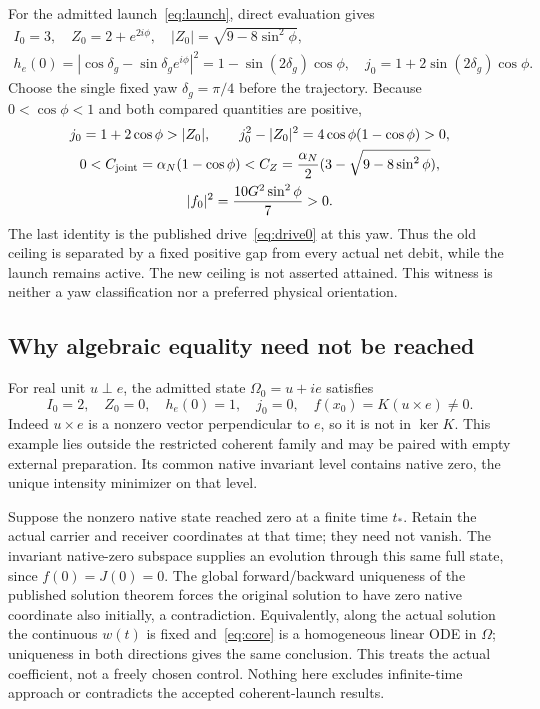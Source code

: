 For the admitted launch~\eqref{eq:launch}, direct evaluation gives
\begin{equation}\label{eq:launchprojection}%
\begin{gathered}
I_0=3,\quad Z_0=2+e^{2i\phi},\quad |Z_0|=\sqrt{9-8\sin^2\phi},\\
h_e(0)=|\cos\delta_g-\sin\delta_g e^{i\phi}|^2
=1-\sin(2\delta_g)\cos\phi,\quad
j_0=1+2\sin(2\delta_g)\cos\phi .
\end{gathered}
\end{equation}
Choose the single fixed yaw $\delta_g=\pi/4$ before the trajectory. Because $0<\cos\phi<1$ and both compared quantities are positive,
\begin{equation}\label{eq:strictwitness}%
\begin{gathered}
j_0=1+2\cos\phi>|Z_0|,\qquad
j_0^2-|Z_0|^2=4\cos\phi(1-\cos\phi)>0,\\
0<C_{\rm joint}=\alpha_N(1-\cos\phi)
<C_Z=\frac{\alpha_N}{2}(3-\sqrt{9-8\sin^2\phi}),\\
|f_0|^2=\frac{10G^2\sin^2\phi}{7}>0 .
\end{gathered}
\end{equation}
The last identity is the published drive~\eqref{eq:drive0} at this yaw. Thus the old ceiling is separated by a fixed positive gap from every actual net debit, while the launch remains active. The new ceiling is not asserted attained. This witness is neither a yaw classification nor a preferred physical orientation.

\subsection{Why algebraic equality need not be reached}
For real unit $u\perp e$, the admitted state $\Omega_0=u+ie$ satisfies
\begin{equation}\label{eq:nonattainment}%
I_0=2,\quad Z_0=0,\quad h_e(0)=1,\quad j_0=0,\quad
f(x_0)=K(u\times e)\ne0 .
\end{equation}
Indeed $u\times e$ is a nonzero vector perpendicular to $e$, so it is not in $\ker K$. This example lies outside the restricted coherent family and may be paired with empty external preparation. Its common native invariant level contains native zero, the unique intensity minimizer on that level.

Suppose the nonzero native state reached zero at a finite time $t_*$. Retain the actual carrier and receiver coordinates at that time; they need not vanish. The invariant native-zero subspace supplies an evolution through this same full state, since $f(0)=J(0)=0$. The global forward/backward uniqueness of the published solution theorem forces the original solution to have zero native coordinate also initially, a contradiction. Equivalently, along the actual solution the continuous $w(t)$ is fixed and~\eqref{eq:core} is a homogeneous linear ODE in $\Omega$; uniqueness in both directions gives the same conclusion. This treats the actual coefficient, not a freely chosen control. Nothing here excludes infinite-time approach or contradicts the accepted coherent-launch results.
